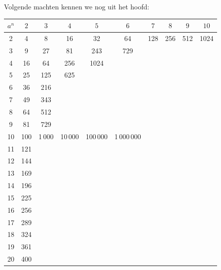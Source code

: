 \documentclass[12pt,twoside]{article}
\begin{document}
Volgende machten kennen we nog uit het hoofd:

\begin{center}
\begin{tabular}{|c|c|c|c|c|c|c|c|c|c|}
  \hline
  $a^n$ & $2$ & $3$ & $4$ & $5$ & $6$ & $7$ & $8$ & $9$ & $10$\\
  \hline
  2     & 4   & 8   & 16  & 32  & 64  & 128 & 256 & 512 & 1024\\
  \cline{1-10}
  3     & 9   & 27  & 81  & 243 & 729\\
  \cline{1-6}
  4     & 16  & 64  & 256 & 1024\\
  \cline{1-5}
  5     & 25  & 125 & 625\\
  \cline{1-4}
  6     & 36  & 216\\
  \cline{1-3}
  7     & 49  & 343\\
  \cline{1-3}
  8     & 64  & 512\\
  \cline{1-3}
  9     & 81  & 729\\
  \cline{1-6}
  10    & 100  & 1\,000 & 10\,000 & 100\,000 & 1\,000\,000\\
  \cline{1-6}
  11    & 121\\
  \cline{1-2}
  12    & 144\\
  \cline{1-2}
  13    & 169\\
  \cline{1-2}
  14    & 196\\
  \cline{1-2}
  15    & 225\\
  \cline{1-2}
  16    & 256\\
  \cline{1-2}
  17    & 289\\
  \cline{1-2}
  18    & 324\\
  \cline{1-2}
  19    & 361\\
  \cline{1-2}
  20    & 400\\
  \cline{1-2}
\end{tabular}
\end{center}


\end{document}
